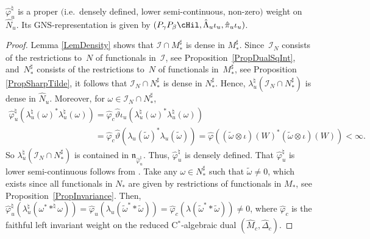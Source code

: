 \begin{prop}\label{PropNSFWeightCast}
$\hat{\varphi}_u^\natural $ is a proper $($i.e.\ densely defined, lower semi-continuous, non-zero$)$ weight on $\hat{N}_u$. Its GNS-representation is given by  $(P_\gamma P_\beta \cHil, \hat{\Lambda}_{u}  \iota_u, \hat{\pi}_{u}  \iota_u )$.
\end{prop}
\begin{proof}
Lemma \ref{LemDensity} shows that  $\mathcal{I} \cap M_\ast^\sharp$ is dense in $M_\ast^\sharp$.
Since~$\mathcal{I}_N$ consists of the restrictions to~$N$ of functionals in~$\mathcal{I}$, see Proposition~\ref{PropDualSqInt}, and~$N_\ast^\sharp$ consists of the restrictions to~$N$ of functionals in~$M_\ast^\sharp$, see Proposition \ref{PropSharpTilde}, it follows that $\mathcal{I}_N \cap N_\ast^\sharp$ is dense in $N_\ast^\sharp$. Hence, $\lambda_u^\natural(\mathcal{I}_N \cap N_\ast^\sharp)$ is dense in $\hat{N}_u$. Moreover, for $\omega \in \mathcal{I}_N \cap N_\ast^\sharp$,
\begin{gather*}
 \hat{\varphi}^\natural_u(\lambda_u^\natural(\omega)^\ast\lambda_u^\natural(\omega) ) = \hat{\varphi}_c \hat{\vartheta} \iota_u (\lambda_u^\natural(\omega)^\ast\lambda_u^\natural(\omega) )
\\
\phantom{\hat{\varphi}^\natural_u(\lambda_u^\natural(\omega)^\ast\lambda_u^\natural(\omega) )}{}
=  \hat{\varphi}_c \hat{\vartheta} (\lambda_u(\tilde{\omega})^\ast\lambda_u(\tilde{\omega}) ) = \hat{\varphi}( (\tilde{\omega} \otimes \iota)(W)^\ast (\tilde{\omega} \otimes \iota)(W) )
< \infty .
\end{gather*}
So   $\lambda_u^\natural(\mathcal{I}_N \cap N_\ast^\sharp)$ is contained in $\mathfrak{n}_{\hat{\varphi}_u^\natural}$. Thus, $\hat{\varphi}^\natural_u$ is densely def\/ined.
 That $\hat{\varphi}_u^\natural $ is lower semi-continuous follows from \cite[Def\/inition~1.5]{KusVae}. Take any $\omega \in N_\ast^\sharp$ such that $\tilde{\omega} \not = 0$, which exists since all functionals in $N_\ast$ are given by restrictions of functionals in $M_\ast$, see Proposition~\ref{PropInvariance}. Then, $\hat{\varphi}_u^\natural ( \lambda_u^\natural( \omega^\ast \ast^\natural \omega) ) = \hat{\varphi}_u( \lambda_u (\tilde{\omega}^\ast \ast \tilde{\omega}) ) = \hat{\varphi}_c(\lambda(\tilde{\omega}^\ast \ast \tilde{\omega})) \not = 0 $, where $\hat{\varphi}_c$ is the faithful left invariant weight on the reduced C$^\ast$-algebraic dual $(\hat{M}_c, \hat{\Delta}_c)$.


\end{proof}

